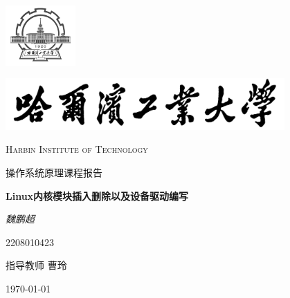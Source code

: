 \documentclass[12pt,a4paper]{report}
\begin{document}
\begin{titlepage}
	\centering
	\includegraphics[width=0.2\textwidth]{sf1.png}\par
	\vspace{1cm}
	\includegraphics[width=0.8\textwidth]{sf.jpg}\par
	\vspace{0.1cm}
	{\scshape\LARGE Harbin Institute of Technology \par}
	\vspace{1cm}
	{\kaishu\LARGE 操作系统原理课程报告\par}
	\vspace{1.5cm}
	{\huge\bfseries Linux内核模块插入删除以及设备驱动编写\par}
	\vspace{2cm}
	{\fangsong\Large\itshape 魏鹏超\par}
	\vfill
	{2208010423}\par

	\vfill
	指导教师	\textsc{曹玲}
	\vfill
	{\large \today\par}
\end{titlepage}
\end{document}
